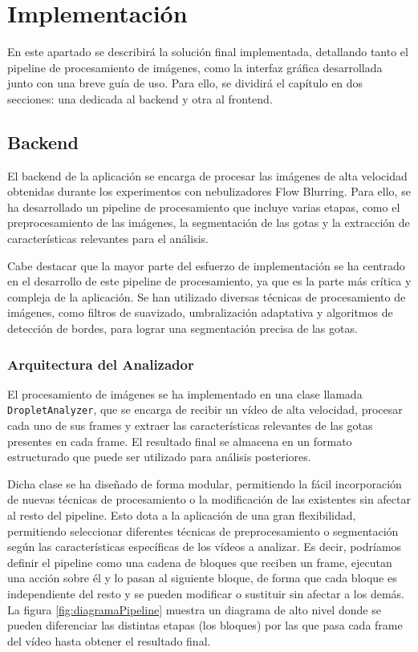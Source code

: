 
\chapter{Implementación}\label{cap:implementacion}

En este apartado se describirá la solución final implementada, detallando tanto el pipeline de procesamiento de imágenes, como la interfaz gráfica desarrollada junto con una breve guía de uso. Para ello, se dividirá el capítulo en dos secciones: una dedicada al backend y otra al frontend.

\section{Backend}

El backend de la aplicación se encarga de procesar las imágenes de alta velocidad obtenidas durante los experimentos con nebulizadores Flow Blurring. Para ello, se ha desarrollado un pipeline de procesamiento que incluye varias etapas, como el preprocesamiento de las imágenes, la segmentación de las gotas y la extracción de características relevantes para el análisis.

Cabe destacar que la mayor parte del esfuerzo de implementación se ha centrado en el desarrollo de este pipeline de procesamiento, ya que es la parte más crítica y compleja de la aplicación. Se han utilizado diversas técnicas de procesamiento de imágenes, como filtros de suavizado, umbralización adaptativa y algoritmos de detección de bordes, para lograr una segmentación precisa de las gotas.

\subsection{Arquitectura del Analizador}

El procesamiento de imágenes se ha implementado en una clase llamada \texttt{DropletAnalyzer}, que se encarga de recibir un vídeo de alta velocidad, procesar cada uno de sus frames y extraer las características relevantes de las gotas presentes en cada frame. El resultado final se almacena en un formato estructurado que puede ser utilizado para análisis posteriores.

Dicha clase se ha diseñado de forma modular, permitiendo la fácil incorporación de nuevas técnicas de procesamiento o la modificación de las existentes sin afectar al resto del pipeline. Esto dota a la aplicación de una gran flexibilidad, permitiendo seleccionar diferentes técnicas de preprocesamiento o segmentación según las características específicas de los vídeos a analizar. Es decir, podríamos definir el pipeline como una cadena de bloques que reciben un frame, ejecutan una acción sobre él y lo pasan al siguiente bloque, de forma que cada bloque es independiente del resto y se pueden modificar o sustituir sin afectar a los demás. La figura \ref{fig:diagramaPipeline} muestra un diagrama de alto nivel donde se pueden diferenciar las distintas etapas (los bloques) por las que pasa cada frame del vídeo hasta obtener el resultado final.

